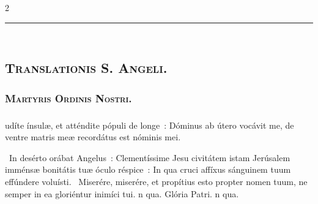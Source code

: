 \documentclass[9pt,twoside]{extarticle}
\begin{document}
\begin{multicols}{2}
{\begin{center}\textcolor{red}{\rule{\linewidth}{0.5pt}} \end{center}

\subsection*{\center \textsc{\\
Translationis S. Angeli.}}
\subsubsection*{\center \textsc{Martyris Ordinis Nostri.}}
\subsubsection*{\center {}}

\begin{tightlist}{}
\item {}
\end{tightlist}

\subsubsection*{}
udíte ínsulæ, et atténdite pópuli de longe~: Dóminus ab útero vocávit me, de ventre matris meæ recordátus est nóminis mei.


\begin{tightlist}{}
\item {}~In desérto orábat Angelus~: Clementíssime Jesu civitátem istam Jerúsalem imménsæ bonitátis tuæ óculo réspice~: \textred{*} In qua cruci affíxus sánguinem tuum effúndere voluísti.
~Miserére, miserére, et propítius esto propter nomen tuum, ne semper in ea gloriéntur inimíci tui. n qua. Glória Patri. n qua.
\end{tightlist}

}
\end{multicols}
\end{document}
